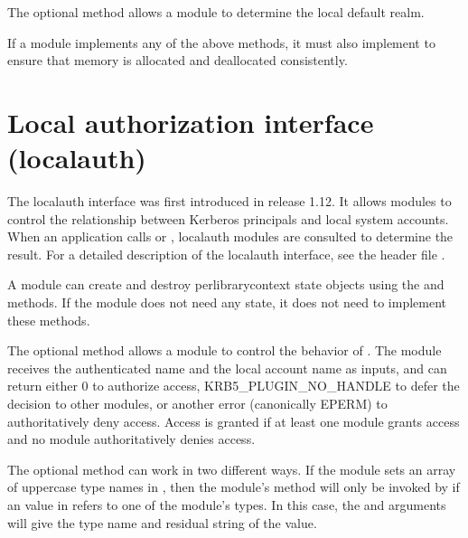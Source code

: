 \documentclass[letterpaper,10pt,english]{sphinxmanual}
\begin{document}
\sphinxAtStartPar
The optional  method allows a module to determine the
local default realm.

\sphinxAtStartPar
If a module implements any of the above methods, it must also
implement  to ensure that memory is allocated and
deallocated consistently.

\sphinxstepscope


\section{Local authorization interface (localauth)}
\label{\detokenize{plugindev/localauth:local-authorization-interface-localauth}}\label{\detokenize{plugindev/localauth:localauth-plugin}}\label{\detokenize{plugindev/localauth::doc}}
\sphinxAtStartPar
The localauth interface was first introduced in release 1.12.  It
allows modules to control the relationship between Kerberos principals
and local system accounts.  When an application calls
 or , localauth
modules are consulted to determine the result.  For a detailed
description of the localauth interface, see the header file
.

\sphinxAtStartPar
A module can create and destroy per\sphinxhyphen{}library\sphinxhyphen{}context state objects
using the  and  methods.  If the module does not need
any state, it does not need to implement these methods.

\sphinxAtStartPar
The optional  method allows a module to control the behavior
of .  The module receives the authenticated name
and the local account name as inputs, and can return either 0 to
authorize access, KRB5\_PLUGIN\_NO\_HANDLE to defer the decision to other
modules, or another error (canonically EPERM) to authoritatively deny
access.  Access is granted if at least one module grants access and no
module authoritatively denies access.

\sphinxAtStartPar
The optional  method can work in two different ways.  If the
module sets an array of uppercase type names in , then
the module’s  method will only be invoked by
 if an  value in
 refers to one of the module’s types.  In this
case, the  and  arguments will give the type name and
residual string of the  value.
\end{document}
